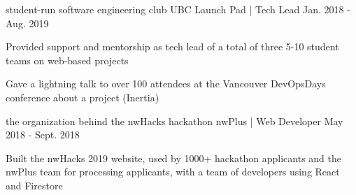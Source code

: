 \begin{cventries}

  \cventry
    {student-run software engineering club} %
    {UBC Launch Pad | Tech Lead} %
    {} %
    {Jan. 2018 - Aug. 2019} %
    {
      \begin{cvitems} %
        \item {Provided support and mentorship as tech lead of a total of three 5-10 student teams on web-based projects}
        \item {Gave a lightning talk to over 100 attendees at the Vancouver DevOpsDays conference about a project (Inertia)}
      \end{cvitems}
    }

  \cventry
    {the organization behind the nwHacks hackathon} %
    {nwPlus | Web Developer} %
    {} %
    {May 2018 - Sept. 2018} %
    {
      \begin{cvitems} %
        \item {Built the nwHacks 2019 website, used by 1000+ hackathon applicants and the nwPlus team for processing applicants, with a team of developers using React and Firestore}
      \end{cvitems}
    }

\end{cventries}
